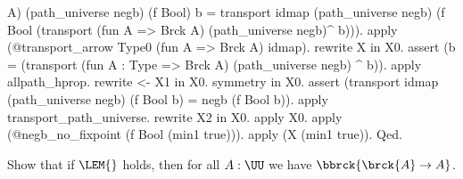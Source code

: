 \begin{coqdoccode}
\begin{coqdoccomment}
A)\coqdocindent{0.50em}
(path\_universe\coqdocindent{0.50em}
negb)\coqdocindent{0.50em}
(f\coqdocindent{0.50em}
Bool)\coqdocindent{0.50em}
b\coqdoceol
\coqdocindent{5.00em}
=\coqdoceol
\coqdocindent{5.00em}
transport\coqdocindent{0.50em}
idmap\coqdocindent{0.50em}
(path\_universe\coqdocindent{0.50em}
negb)\coqdocindent{0.50em}
\coqdoceol
\coqdocindent{10.00em}
(f\coqdocindent{0.50em}
Bool\coqdocindent{0.50em}
(transport\coqdocindent{0.50em}
(fun\coqdocindent{0.50em}
A\coqdocindent{0.50em}
=>\coqdocindent{0.50em}
Brck\coqdocindent{0.50em}
A)\coqdocindent{0.50em}
\coqdoceol
\coqdocindent{19.50em}
(path\_universe\coqdocindent{0.50em}
negb)\^{}\coqdoceol
\coqdocindent{19.50em}
b))).\coqdoceol
\coqdocindent{1.00em}
apply\coqdocindent{0.50em}
(@transport\_arrow\coqdocindent{0.50em}
Type0\coqdocindent{0.50em}
(fun\coqdocindent{0.50em}
A\coqdocindent{0.50em}
=>\coqdocindent{0.50em}
Brck\coqdocindent{0.50em}
A)\coqdocindent{0.50em}
idmap).\coqdoceol
\coqdocindent{1.00em}
rewrite\coqdocindent{0.50em}
X\coqdocindent{0.50em}
in\coqdocindent{0.50em}
X0.\coqdoceol
\coqdocindent{1.00em}
assert\coqdocindent{0.50em}
(b\coqdocindent{0.50em}
=\coqdocindent{0.50em}
(transport\coqdocindent{0.50em}
(fun\coqdocindent{0.50em}
A\coqdocindent{0.50em}
:\coqdocindent{0.50em}
Type\coqdocindent{0.50em}
=>\coqdocindent{0.50em}
Brck\coqdocindent{0.50em}
A)\coqdocindent{0.50em}
(path\_universe\coqdocindent{0.50em}
negb)\coqdocindent{0.50em}
\^{}\coqdocindent{0.50em}
b)).\coqdoceol
\coqdocindent{1.00em}
apply\coqdocindent{0.50em}
allpath\_hprop.\coqdocindent{0.50em}
rewrite\coqdocindent{0.50em}
<-\coqdocindent{0.50em}
X1\coqdocindent{0.50em}
in\coqdocindent{0.50em}
X0.\coqdocindent{0.50em}
symmetry\coqdocindent{0.50em}
in\coqdocindent{0.50em}
X0.\coqdoceol
\coqdocindent{1.00em}
assert\coqdocindent{0.50em}
(transport\coqdocindent{0.50em}
idmap\coqdocindent{0.50em}
(path\_universe\coqdocindent{0.50em}
negb)\coqdocindent{0.50em}
(f\coqdocindent{0.50em}
Bool\coqdocindent{0.50em}
b)\coqdocindent{0.50em}
=\coqdocindent{0.50em}
negb\coqdocindent{0.50em}
(f\coqdocindent{0.50em}
Bool\coqdocindent{0.50em}
b)).\coqdoceol
\coqdocindent{1.00em}
apply\coqdocindent{0.50em}
transport\_path\_universe.\coqdocindent{0.50em}
rewrite\coqdocindent{0.50em}
X2\coqdocindent{0.50em}
in\coqdocindent{0.50em}
X0.\coqdocindent{0.50em}
apply\coqdocindent{0.50em}
X0.\coqdoceol
\coqdocindent{1.00em}
apply\coqdocindent{0.50em}
(@negb\_no\_fixpoint\coqdocindent{0.50em}
(f\coqdocindent{0.50em}
Bool\coqdocindent{0.50em}
(min1\coqdocindent{0.50em}
true))).\coqdocindent{0.50em}
\coqdoceol
\coqdocindent{1.00em}
apply\coqdocindent{0.50em}
(X\coqdocindent{0.50em}
(min1\coqdocindent{0.50em}
true)).\coqdoceol
Qed.\coqdoceol
\end{coqdoccomment}
\coqdoceol
\coqdocemptyline
\coqdocemptyline
\end{coqdoccode}
Show that if $\LEM{}$ holds, then for all $A : \UU$ we have $\bbrck{\brck{A}
\to A}$.


